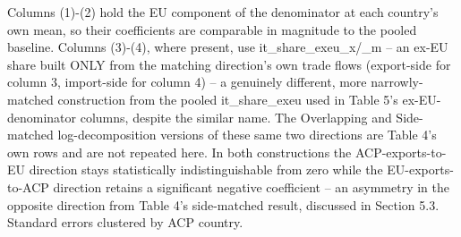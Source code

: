 \par \raggedright 
Columns (1)-(2) hold the EU component of the denominator at each country's own mean, so their coefficients are comparable in magnitude to the pooled baseline. Columns (3)-(4), where present, use it\_share\_exeu\_x/\_m -- an ex-EU share built ONLY from the matching direction's own trade flows (export-side for column 3, import-side for column 4) -- a genuinely different, more narrowly-matched construction from the pooled it\_share\_exeu used in Table 5's ex-EU-denominator columns, despite the similar name. The Overlapping and Side-matched log-decomposition versions of these same two directions are Table 4's own rows and are not repeated here. In both constructions the ACP-exports-to-EU direction stays statistically indistinguishable from zero while the EU-exports-to-ACP direction retains a significant negative coefficient -- an asymmetry in the opposite direction from Table 4's side-matched result, discussed in Section 5.3. Standard errors clustered by ACP country.
\par\endgroup


